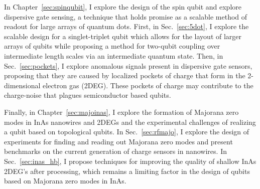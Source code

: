 In Chapter~\ref{sec:spinqubit}, I explore the design of the spin qubit and explore dispersive gate sensing, a
technique that holds promise as a scalable method of readout for large arrays of quantum dots. First, in Sec.~\ref{sec:5dot},
I explore the scalable design for a singlet-triplet qubit which allows for the layout of larger arrays of qubits
while proposing a method for two-qubit coupling over intermediate length scales via an intermediate quantum state.
Then, in Sec.~\ref{sec:pockets}, I explore anomalous signals present in dispersive gate sensors, proposing that they
are caused by localized pockets of charge that form in the 2-dimensional electron gas (2DEG). These pockets of charge may
contribute to the charge-noise that plagues semiconductor based qubits.

Finally, in Chapter~\ref{sec:majoinas}, I explore the formation of Majorana zero modes in InAs nanowires and
2DEGs and the experimental challenges of realizing a qubit based on topological qubits. In Sec.~\ref{sec:rfmajo}, I explore
the design of experiments for finding and reading out Majorana zero modes and present benchmarks on the current
generation of charge sensors in nanowires. In Sec.~\ref{sec:inas_hb}, I propose techniques for improving the quality
of shallow InAs 2DEG's after processing, which remains a limiting factor in the design of qubits based on Majorana zero
modes in InAs.